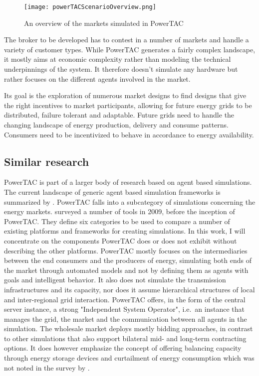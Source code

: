 \begin{figure}[h]%
    \texttt{[image: powerTACScenarioOverview.png]}
    \caption{An overview of the markets simulated in PowerTAC}
    \label{fig:powertacoverview}
\end{figure}


The broker to be developed has to contest in a number of markets and handle a variety of customer types. While
\ac{PowerTAC} generates a fairly complex landscape, it mostly aims at economic complexity rather than
modeling the technical underpinnings of the system. It therefore doesn't simulate any hardware but rather focuses on the
different agents involved in the market.

Its goal is the exploration of numerous market designs to find designs that give the right incentives to market
participants, allowing for future energy grids to be distributed, failure tolerant and adaptable. Future grids need to handle the
changing landscape of energy production, delivery and consume patterns. Consumers need to be incentivized to behave in
accordance to energy availability.

\subsection{Similar research}%
\label{sub:similar_research}

\ac{PowerTAC} is part of a larger body of research based on agent based simulations. The current landscape of generic
agent based simulation frameworks is summarized by \citet{abar2017agent}. \ac{PowerTAC} falls into a subcategory of
simulations concerning the energy markets. \citet{zhou2007agent} surveyed a number of tools in 2009, before the
inception of \ac{PowerTAC}. They define six categories to be used to compare a number of existing platforms and
frameworks for creating simulations. In this work, I will concentrate on the components \ac{PowerTAC} does or does not
exhibit without describing the other platforms. \ac{PowerTAC} mostly focuses on the intermediaries between the end
consumers and the producers of energy, simulating both ends of the market through automated models and not by defining
them as agents with goals and intelligent behavior. It also does not simulate the transmission infrastructures and its
capacity, nor does it assume hierarchical structures of local and inter-regional grid interaction. \ac{PowerTAC} offers,
in the form of the central server instance, a strong "Independent System Operator", i.e.\ an instance that manages the
grid, the market and the communication between all agents in the simulation. The wholesale market deploys mostly
bidding approaches, in contrast to other simulations that also support bilateral mid- and long-term contracting options.
It does however emphasize the concept of offering balancing capacity through energy storage devices and curtailment of
energy consumption which was not noted in the survey by \citet{zhou2007agent}.

